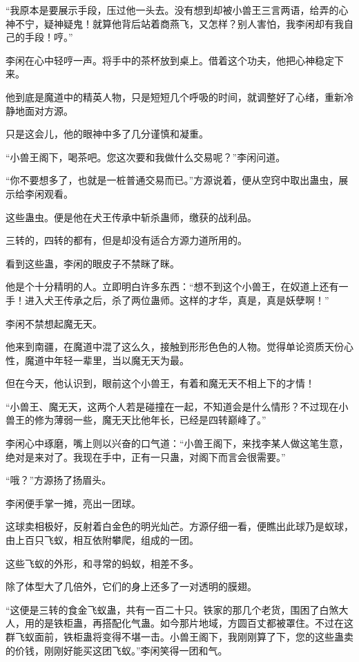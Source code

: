 \begin{this_body}
“我原本是要展示手段，压过他一头去。没有想到却被小兽王三言两语，给弄的心神不宁，疑神疑鬼！就算他背后站着商燕飞，又怎样？别人害怕，我李闲却有我自己的手段！哼。”

李闲在心中轻哼一声。将手中的茶杯放到桌上。借着这个功夫，他把心神稳定下来。

他到底是魔道中的精英人物，只是短短几个呼吸的时间，就调整好了心绪，重新冷静地面对方源。

只是这会儿，他的眼神中多了几分谨慎和凝重。

“小兽王阁下，喝茶吧。您这次要和我做什么交易呢？”李闲问道。

“你不要想多了，也就是一桩普通交易而已。”方源说着，便从空窍中取出蛊虫，展示给李闲观看。

这些蛊虫。便是他在犬王传承中斩杀蛊师，缴获的战利品。

三转的，四转的都有，但是却没有适合方源力道所用的。

看到这些蛊，李闲的眼皮子不禁眯了眯。

他是个十分精明的人。立即明白许多东西：“想不到这个小兽王，在奴道上还有一手！进入犬王传承之后，杀了两位蛊师。这样的才华，真是，真是妖孽啊！”

李闲不禁想起魔无天。

他来到南疆，在魔道中混了这么久，接触到形形色色的人物。觉得单论资质天份心性，魔道中年轻一辈里，当以魔无天为最。

但在今天，他认识到，眼前这个小兽王，有着和魔无天不相上下的才情！

“小兽王、魔无天，这两个人若是碰撞在一起，不知道会是什么情形？不过现在小兽王的修为薄弱一些，魔无天比他年长，已经是四转巅峰了。”

李闲心中琢磨，嘴上则以兴奋的口气道：“小兽王阁下，来找李某人做这笔生意，绝对是来对了。我现在手中，正有一只蛊，对阁下而言会很需要。”

“哦？”方源扬了扬眉头。

李闲便手掌一摊，亮出一团球。

这球卖相极好，反射着白金色的明光灿芒。方源仔细一看，便瞧出此球乃是蚁球，由上百只飞蚁，相互依附攀爬，组成的一团。

这些飞蚁的外形，和寻常的蚂蚁，相差不多。

除了体型大了几倍外，它们的身上还多了一对透明的膜翅。

“这便是三转的食金飞蚁蛊，共有一百二十只。铁家的那几个老货，围困了白煞大人，用的是铁柜蛊，再搭配化气蛊。如今那片地域，方圆百丈都被罩住。不过在这群飞蚁面前，铁柜蛊将变得不堪一击。小兽王阁下，我刚刚算了下，您的这些蛊卖的价钱，刚刚好能买这团飞蚁。”李闲笑得一团和气。


\end{this_body}
